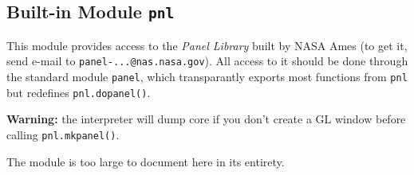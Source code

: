 \subsection{Built-in Module {\tt pnl}}

This module provides access to the
{\em Panel Library}
built by NASA Ames (to get it, send e-mail to
{\tt panel-...@nas.nasa.gov}).
All access to it should be done through the standard module
{\tt panel},
which transparantly exports most functions from
{\tt pnl}
but redefines
{\tt pnl.dopanel()}.

{\bf Warning:}
the {\Python} interpreter will dump core if you don't create a GL window
before calling
{\tt pnl.mkpanel()}.

The module is too large to document here in its entirety.
